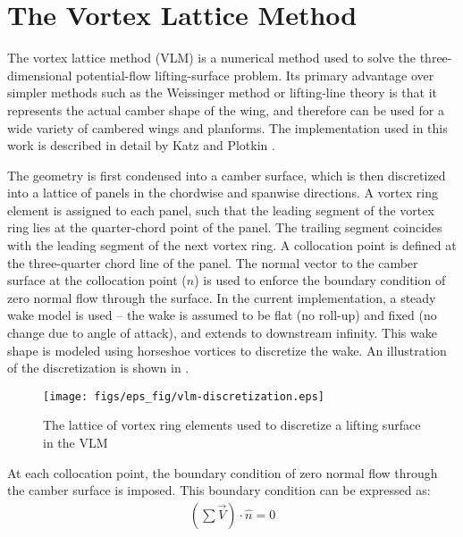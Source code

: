 \section{The Vortex Lattice Method}
\label{sec:vlm}
The vortex lattice method (VLM) is a numerical method used to solve the three-dimensional potential-flow lifting-surface problem. Its primary advantage over simpler methods such as the Weissinger method or lifting-line theory is that it represents the actual camber shape of the wing, and therefore can be used for a wide variety of cambered wings and planforms. The implementation used in this work is described in detail by Katz and Plotkin \cite{katz_plotkin_book_1991}.

The geometry is first condensed into a camber surface, which is then discretized into a lattice of panels in the chordwise and spanwise directions. A vortex ring element is assigned to each panel, such that the leading segment of the vortex ring lies at the quarter-chord point of the panel. The trailing segment coincides with the leading segment of the next vortex ring. A collocation point is defined at the three-quarter chord line of the panel. The normal vector to the camber surface at the collocation point ($\hat{n}$) is used to enforce the boundary condition of zero normal flow through the surface. In the current implementation, a steady wake model is used -- the wake is assumed to be flat (no roll-up) and fixed (no change due to angle of attack), and extends to downstream infinity. This wake shape is modeled using horseshoe vortices to discretize the wake. An illustration of the discretization is shown in .

\begin{figure}[!htbp]
    \centering
    \texttt{[image: figs/eps\_fig/vlm-discretization.eps]}
    \caption{The lattice of vortex ring elements used to discretize a lifting surface in the VLM}
    \label{fig:vlm-panels}
\end{figure}

At each collocation point, the %
boundary condition of zero normal flow through the camber surface is imposed. This boundary condition can be expressed as:
\begin{align}
    \left(\sum \vec{V}\right) \cdot \hat{n} = 0 \label{eqn:boundary-condition}
\end{align}


